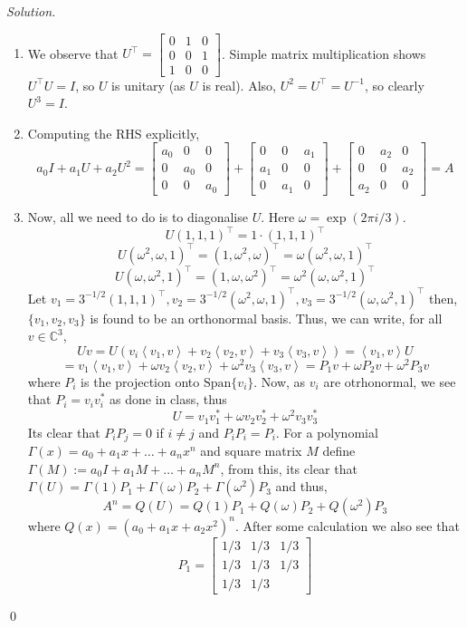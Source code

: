 \documentclass[12pt,a4paper]{article}
\newenvironment{solution}{%
  \par\noindent\textit{Solution.}\ }{\qed}
\theoremstyle{problemstyle}
\def\bC{\mathbb{C}}
\newcommand{\ipp}[1]{{\left\langle{#1}\right\rangle}}
\begin{document}
\begin{solution}
\begin{enumerate}[\label=(\roman*)]
\item We observe that $U^\top=\begin{bmatrix}0&1&0\\ 0&0&1\\ 1&0&0\end{bmatrix}$. Simple matrix multiplication shows $U^\top U=I$, so $U$ is unitary (as $U$ is real). Also, $U^2=U^\top=U^{-1}$, so clearly $U^3=I$.
\item Computing the RHS explicitly,
$$a_0I+a_1U+a_2U^2=\begin{bmatrix}a_0&0&0\\ 0&a_0&0\\ 0&0&a_0\end{bmatrix}+\begin{bmatrix}0&0&a_1\\ a_1&0&0\\ 0&a_1&0\end{bmatrix}+\begin{bmatrix}0&a_2&0\\ 0&0&a_2\\ a_2&0&0\end{bmatrix}=A$$
\item Now, all we need to do is to diagonalise $U$. Here $\omega=\exp(2\pi i/3)$.
$$U(1,1,1)^\top=1\cdot(1,1,1)^\top$$
$$U(\omega^2,\omega,1)^\top=(1,\omega^2,\omega)^\top=\omega(\omega^2,\omega,1)^\top$$
$$U(\omega,\omega^2,1)^\top=(1,\omega,\omega^2)^\top=\omega^2(\omega,\omega^2,1)^\top$$
Let $v_1=3^{-1/2}(1,1,1)^\top, v_2=3^{-1/2}(\omega^2,\omega,1)^\top, v_3=3^{-1/2}(\omega,\omega^2,1)^\top$ then, $\{v_1,v_2,v_3\}$ is found to be an orthonormal basis. Thus, we can write, for all $v\in\bC^3$,
$$Uv=U(v_i\ipp{v_1,v}+v_2\ipp{v_2,v}+v_3\ipp{v_3,v})=\ipp{v_1,v}U$$
$$=v_1\ipp{v_1,v}+\omega v_2\ipp{v_2,v}+\omega^2 v_3\ipp{v_3,v}=P_1v+\omega
P_2v+\omega^2 P_3v$$
where $P_i$ is the projection onto $\text{Span}\{v_i\}$. Now, as $v_i$ are
otrhonormal, we see that $P_i=v_iv_i^*$ as done in class, thus
$$U=v_1v_1^*+\omega v_2v_2^*+\omega^2 v_3v_3^*$$
Its clear that $P_iP_j=0$ if $i\neq j$ and $P_iP_i=P_i$. For a polynomial
$\Gamma(x)=a_0+a_1x+\ldots+a_nx^n$ and square matrix $M$ define
$\Gamma(M):=a_0I+a_1M+\ldots+a_nM^n$, from this, its clear that
$\Gamma(U)=\Gamma(1)P_1+\Gamma(\omega)P_2+\Gamma(\omega^2)P_3$ and thus,
$$A^n=Q(U)=Q(1)P_1+Q(\omega)P_2+Q(\omega^2)P_3$$
where $Q(x)=(a_0+a_1x+a_2x^2)^n$. After some calculation we also see that
$$P_1=\begin{bmatrix}1/3 & 1/3 & 1/3\\ 1/3 & 1/3 & 1/3\\ 1/3 & 1/3 &

\end{bmatrix}$$
\end{enumerate}
\end{solution}
\end{document}
